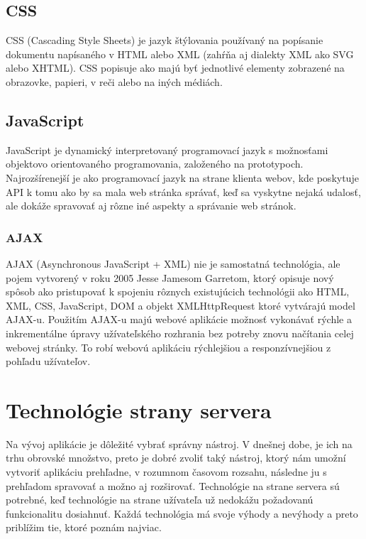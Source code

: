 \subsection*{CSS}

CSS (Cascading Style Sheets) je jazyk štýlovania používaný na popísanie dokumentu napísaného v HTML alebo XML (zahŕňa aj dialekty XML ako SVG alebo XHTML). CSS popisuje ako majú byť jednotlivé elementy zobrazené na obrazovke, papieri, v reči alebo na iných médiách.

\subsection*{JavaScript}

JavaScript je dynamický interpretovaný programovací jazyk s možnosťami objektovo orientovaného programovania, založeného na prototypoch. Najrozšírenejší je ako programovací jazyk na strane klienta webov, kde poskytuje API k tomu ako by sa mala web stránka správať, keď sa vyskytne nejaká udalosť, ale dokáže spravovať aj rôzne iné aspekty a správanie web stránok.

\subsubsection*{AJAX}

AJAX (Asynchronous JavaScript + XML) nie je samostatná technológia, ale pojem vytvorený v roku 2005 Jesse Jamesom Garretom, ktorý opisuje nový spôsob ako pristupovať k spojeniu rôznych existujúcich technológii ako HTML, XML, CSS, JavaScript, DOM a objekt XMLHttpRequest ktoré vytvárajú model AJAX-u. Použitím AJAX-u majú webové aplikácie možnosť vykonávať rýchle a inkrementálne úpravy užívateľského rozhrania bez potreby znovu načítania celej webovej stránky. To robí webovú aplikáciu rýchlejšiou a responzívnejšiou z pohľadu užívateľov.

\section{Technológie strany servera}

Na vývoj aplikácie je dôležité vybrať správny nástroj. V dnešnej dobe, je ich na trhu obrovské množstvo, preto je dobré zvoliť taký nástroj, ktorý nám umožní vytvoriť aplikáciu prehľadne, v rozumnom časovom rozsahu, následne ju s prehľadom spravovať a možno aj rozširovať. Technológie na strane servera sú potrebné, keď technológie na strane užívateľa už nedokážu požadovanú funkcionalitu dosiahnuť. Každá technológia má svoje výhody a nevýhody a preto priblížim tie, ktoré poznám najviac.

